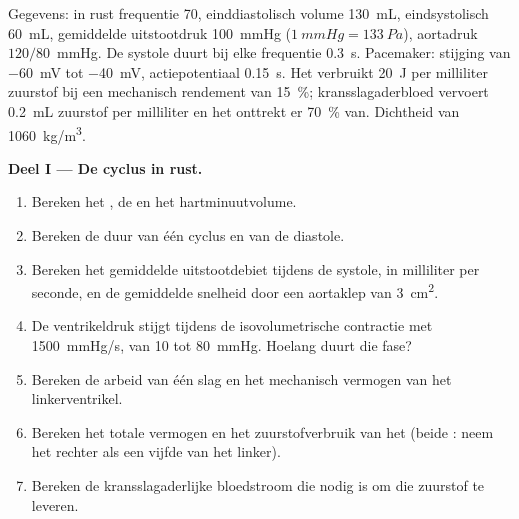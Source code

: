 \begin{problem}
\label{pb:b2:heart:1}
Gegevens: in rust frequentie 70, einddiastolisch volume \qty{130}{mL},
eindsystolisch \qty{60}{mL}, gemiddelde uitstootdruk \qty{100}{mmHg}
($\qty{1}{mmHg} = \qty{133}{Pa}$), aortadruk $120/80$~mmHg.
De systole duurt bij elke frequentie \qty{0.3}{s}. Pacemaker: stijging van
\qty{-60}{mV} tot \qty{-40}{mV}, actiepotentiaal \qty{0.15}{s}. Het
 verbruikt \qty{20}{J} per milliliter zuurstof bij een
mechanisch rendement van \qty{15}{\%}; kransslagaderbloed vervoert
\qty{0.2}{mL} zuurstof per milliliter en het  onttrekt er
\qty{70}{\%} van. Dichtheid van  \qty{1060}{kg/m^3}.

\medskip
\noindent\textbf{Deel I --- De cyclus in rust.}
\begin{enumerate}
  \item Bereken het , de  en het
        hartminuutvolume.
  \item Bereken de duur van één cyclus en van de diastole.
  \item Bereken het gemiddelde uitstootdebiet tijdens de systole, in
        milliliter per seconde, en de gemiddelde snelheid door een aortaklep
        van \qty{3}{cm^2}.
  \item De ventrikeldruk stijgt tijdens de isovolumetrische contractie met
        \qty{1500}{mmHg/s}, van 10 tot \qty{80}{mmHg}. Hoelang duurt die fase?
  \item Bereken de arbeid van één slag en het mechanisch vermogen van het
        linkerventrikel.
  \item Bereken het totale vermogen en het zuurstofverbruik van het 
        (beide : neem het rechter als een vijfde van het linker).
  \item Bereken de kransslagaderlijke bloedstroom die nodig is om die
        zuurstof te leveren.
\end{enumerate}


\end{problem}
